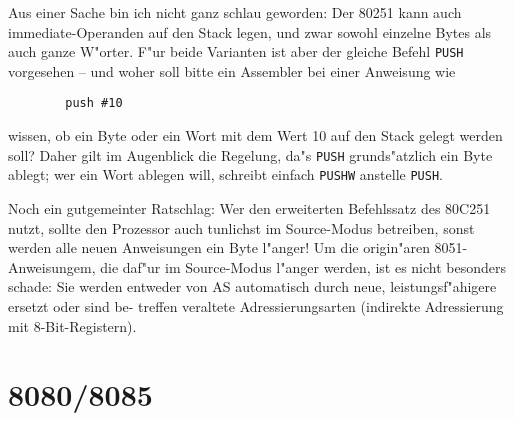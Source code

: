 \documentclass[12pt,a4paper,twoside]{report}
\newcommand{\tty}[1]{{\tt #1}}
\begin{document}
Aus einer Sache bin ich nicht ganz schlau geworden: Der 80251 kann
auch immediate-Operanden auf den Stack legen, und zwar sowohl einzelne
Bytes als auch ganze W"orter.  F"ur beide Varianten ist aber der gleiche
Befehl \tty{PUSH} vorgesehen -- und woher soll bitte ein Assembler bei
einer Anweisung wie
\begin{verbatim}
        push #10
\end{verbatim}
wissen, ob ein Byte oder ein Wort mit dem Wert 10 auf den Stack gelegt
werden soll?  Daher gilt im Augenblick die Regelung, da"s \tty{PUSH}
grunds"atzlich ein Byte ablegt; wer ein Wort ablegen will, schreibt
einfach \tty{PUSHW} anstelle \tty{PUSH}.
\par
Noch ein gutgemeinter Ratschlag: Wer den erweiterten Befehlssatz des
80C251 nutzt, sollte den Prozessor auch tunlichst im Source-Modus
betreiben, sonst werden alle neuen Anweisungen ein Byte l"anger!  Um
die origin"aren 8051-Anweisungem, die daf"ur im Source-Modus l"anger
werden, ist es nicht besonders schade: Sie werden entweder von AS
automatisch durch neue, leistungsf"ahigere ersetzt oder sind be-
treffen veraltete Adressierungsarten (indirekte Adressierung mit
8-Bit-Registern).


\section{8080/8085}
\label{8080Spec}
\end{document}
